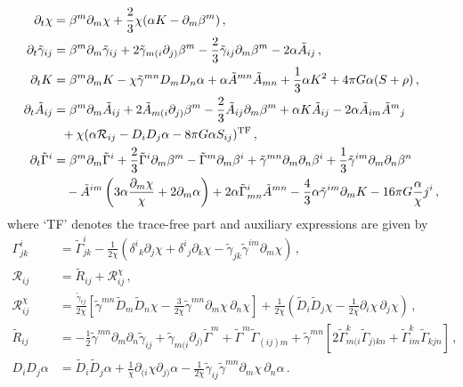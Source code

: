 \begin{align}
  \partial_t \chi &= \beta^m\partial_m \chi
  + \frac{2}{3}\chi( \alpha K-\partial_m \beta^m)\,,
  \label{mal:eq:chit} \\
  \partial_t \tilde{\gamma}_{ij} &=
  \beta^m\partial_m \tilde{\gamma}_{ij}
  + 2 \tilde{\gamma}_{m(i}\partial_{j)}\beta^m
  - \frac{2}{3}\tilde{\gamma}_{ij}\partial_m \beta^m
  -2\alpha \tilde{A}_{ij}\,, \\
  \partial_t K &=
  \beta^m\partial_m K
  -\chi \tilde{\gamma}^{mn}D_m D_n\alpha
  +\alpha \tilde{A}^{mn}\tilde{A}_{mn}
  +\frac{1}{3}\alpha K^2
  +4\pi G \alpha (S+\rho)\,, \\
  \partial_t \tilde{A}_{ij} &=
  \beta^m\partial_m \tilde{A}_{ij}
  +2\tilde{A}_{m(i}\partial_{j)}\beta^m
  -\frac{2}{3}\tilde{A}_{ij}\partial_m \beta^m
  +\alpha K \tilde{A}_{ij}
  -2\alpha\tilde{A}_{im}\tilde{A}^{m}{}_j
  \nonumber \\
  &~~
  +\chi (\alpha \mathcal{R}_{ij}-D_i D_j \alpha -8\pi G
        \alpha S_{ij})^{\rm TF}\,, \\
  \partial_t \tilde{\Gamma}^i &=
  \beta^m \partial_m \tilde{\Gamma}^i
  +\frac{2}{3}\tilde{\Gamma}^i\partial_m \beta^m
  -\tilde{\Gamma}^m\partial_m \beta^i
  +\tilde{\gamma}^{mn}\partial_m\partial_n \beta^i
  +\frac{1}{3}\tilde{\gamma}^{im}\partial_m\partial_n\beta^n
  \nonumber \\
  &~~~
  -\tilde{A}^{im}\left( 3\alpha \frac{\partial_m \chi}{\chi}
        +2\partial_m \alpha\right)
  +2\alpha\tilde{\Gamma}^i_{mn}\tilde{A}^{mn}
  -\frac{4}{3}\alpha\tilde{\gamma}^{im}\partial_m K
  -16\pi G \frac{\alpha}{\chi}j^i\,,
  \label{mal:eq:Gammait}
\end{align}
%
where `TF' denotes the trace-free part and auxiliary expressions
are given by
%
\begin{align}
  \Gamma^i_{jk} &=
  \tilde{\Gamma}^i_{jk}
  -\frac{1}{2\chi}( \delta^i{}_k\partial_j \chi
        +\delta^i{}_j\partial_k \chi
        -\tilde{\gamma}_{jk}\tilde{\gamma}^{im}\partial_m \chi)
        \,, \nonumber\\
  \mathcal{R}_{ij} &= \tilde{R}_{ij}+ \mathcal{R}^{\chi}_{ij}
  \,, \nonumber\\
  \mathcal{R}^{\chi}_{ij} &=
  \frac{\tilde{\gamma}_{ij}}{2\chi}
  \left[
  \tilde{\gamma}^{mn}\tilde{D}_m\tilde{D}_n \chi
  -\frac{3}{2\chi}\tilde{\gamma}^{mn}\partial_m \chi\,\partial_n \chi
  \right]
  +\frac{1}{2\chi}
  \left(
  \tilde{D}_i \tilde{D}_j \chi
  -\frac{1}{2\chi}\partial_i \chi \,\partial_j \chi
  \right)
  \,, \nonumber\\
  \tilde{R}_{ij} &=
  -\frac{1}{2}\tilde{\gamma}^{mn}\partial_m \partial_n\tilde{\gamma}_{ij}
  +\tilde{\gamma}_{m(i}\partial_{j)}\tilde{\Gamma}^m
  +\tilde{\Gamma}^m\tilde{\Gamma}_{(ij)m}
  +\tilde{\gamma}^{mn}
  \left[
  2\tilde{\Gamma}^k_{m(i}\tilde{\Gamma}_{j)kn}
  +\tilde{\Gamma}^k_{im}\tilde{\Gamma}_{kjn}
  \right]\,,\nonumber\\
  D_i D_j \alpha &=
  \tilde{D}_i \tilde{D}_j \alpha
  + \frac{1}{\chi}\partial_{(i}\chi \partial_{j)}\alpha
  -\frac{1}{2\chi}\tilde{\gamma}_{ij}\tilde{\gamma}^{mn}
        \partial_m \chi \,\partial_n \alpha\,.
\end{align}
